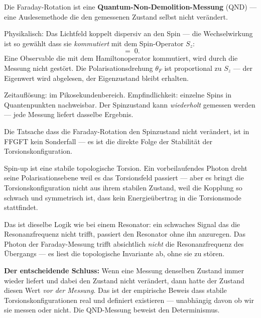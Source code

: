 \begin{keyresult}
Die Faraday-Rotation ist eine
\textbf{Quantum-Non-Demolition-Messung} (QND) ---
eine Auslesemethode die den gemessenen Zustand
selbst nicht verändert.

Physikalisch: Das Lichtfeld koppelt dispersiv an den Spin ---
die Wechselwirkung ist so gewählt dass sie \emph{kommutiert}
mit dem Spin-Operator $S_z$:
\begin{equation}
  [H_\text{Faraday},\; S_z] \;=\; 0.
\end{equation}
Eine Observable die mit dem Hamiltonoperator kommutiert,
wird durch die Messung nicht gestört.
Die Polarisationsdrehung $\theta_F$ ist proportional zu $S_z$
--- der Eigenwert wird abgelesen, der Eigenzustand bleibt erhalten.

Zeitauflösung: im Pikosekundenbereich.
Empfindlichkeit: einzelne Spins in Quantenpunkten nachweisbar.
Der Spinzustand kann \emph{wiederholt} gemessen werden ---
jede Messung liefert dasselbe Ergebnis.
\end{keyresult}

\begin{foundation}
Die Tatsache dass die Faraday-Rotation den Spinzustand
nicht verändert, ist in FFGFT kein Sonderfall ---
es ist die direkte Folge der Stabilität der Torsionskonfiguration.

Spin-up ist eine stabile topologische Torsion.
Ein vorbeilaufendes Photon dreht seine Polarisationsebene
weil es das Torsionsfeld passiert --- aber es bringt
die Torsionskonfiguration nicht aus ihrem stabilen Zustand,
weil die Kopplung so schwach und symmetrisch ist,
dass kein Energieübertrag in die Torsionsmode stattfindet.

Das ist dieselbe Logik wie bei einem Resonator:
ein schwaches Signal das die Resonanzfrequenz nicht trifft,
passiert den Resonator ohne ihn anzuregen.
Das Photon der Faraday-Messung trifft absichtlich
\emph{nicht} die Resonanzfrequenz des Übergangs ---
es liest die topologische Invariante ab, ohne sie zu stören.

\textbf{Der entscheidende Schluss:}
Wenn eine Messung denselben Zustand immer wieder liefert
und dabei den Zustand nicht verändert,
dann hatte der Zustand diesen Wert \emph{vor der Messung}.
Das ist der empirische Beweis dass stabile
Torsionskonfigurationen real und definiert existieren ---
unabhängig davon ob wir sie messen oder nicht.
Die QND-Messung beweist den Determinismus.
\end{foundation}

